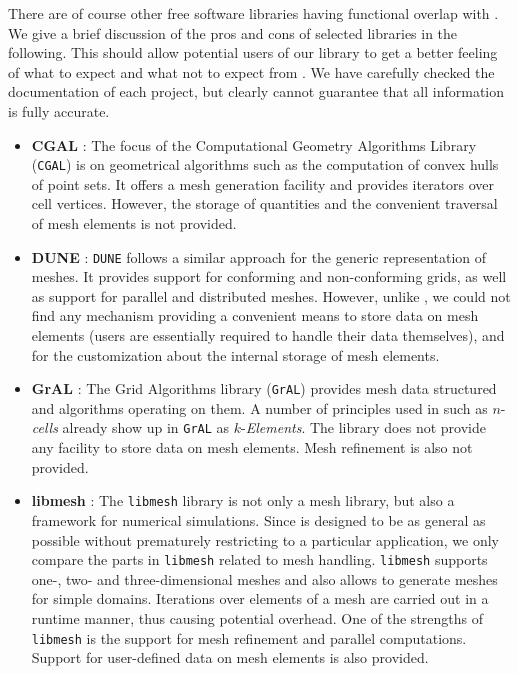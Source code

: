 There are of course other free software libraries having functional overlap with {\ViennaGrid}. We give a brief discussion of the pros and cons of selected libraries in the following. This should allow potential users of our library to get a better feeling of what to expect and what not to expect from {\ViennaGrid}. We have carefully checked the documentation of each project, but clearly cannot guarantee that all information is fully accurate.
\begin{itemize}
  \item \textbf{CGAL} \cite{CGAL}: The focus of the Computational Geometry Algorithms Library (\texttt{CGAL}) is on geometrical algorithms such as the computation of convex hulls of point sets. It offers a mesh generation facility and provides iterators over cell vertices. However, the storage of quantities and the convenient traversal of mesh elements is not provided.

  \item \textbf{DUNE} \cite{DUNE}: \texttt{DUNE} follows a similar approach for the generic representation of meshes. It provides support for conforming and non-conforming grids, as well as support for parallel and distributed meshes. However, unlike {\ViennaGrid}, we could not find any mechanism providing a convenient means to store data on mesh elements (users are essentially required to handle their data themselves), and for the customization about the internal storage of mesh elements.

  \item \textbf{GrAL} \cite{GrAL}: The Grid Algorithms library (\texttt{GrAL}) provides mesh data structured and algorithms operating on them. A number of principles used in {\ViennaGrid} such as $n$-\textit{cells} already show up in \texttt{GrAL} as $k$-\textit{Elements}. The library does not provide any facility to store data on mesh elements. Mesh refinement is also not provided.

  \item \textbf{libmesh} \cite{libmesh}: The \texttt{libmesh} library is not only a mesh library, but also a framework for numerical simulations. Since {\ViennaGrid} is designed to be as general as possible without prematurely restricting to a particular application, we only compare the parts in \texttt{libmesh} related to mesh handling. \texttt{libmesh} supports one-, two- and three-dimensional meshes and also allows to generate meshes for simple domains. Iterations over elements of a mesh are carried out in a runtime manner, thus causing potential overhead. One of the strengths of \texttt{libmesh} is the support for mesh refinement and parallel computations. Support for user-defined data on mesh elements is also provided.


\end{itemize}
